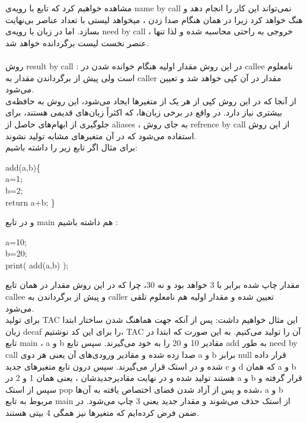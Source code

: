 مشاهده خواهیم کرد که تابع با رویه‌ی
name by call
نمی‌تواند این کار را انجام دهد و هنگ خواهد کرد زیرا در همان هنگام صدا زدن ،
میخواهد لیستی با تعداد عناصر بی‌نهایت بسازد.
اما در زبان با رویه‌ی
need by call
،
خروجی به راحتی محاسبه شده و لذا تنها عنصر نخست لیست برگردانده خواهد شد.
\\
\\
روش 
result by call
:
در این روش
مقدار اولیه
هنگام خوانده شدن در 
callee
نامعلوم است ولی پیش از برگرداندن مقدار به
caller
مقدار در آن کپی خواهد شد و تعیین می‌شود.
\\
از آنجا که در این روش کپی از هر یک از متغیرها ایجاد می‌شود،
این روش به حافظه‌ی بیشتری نیاز دارد.
در واقع در برخی زبان‌ها، که اکثراً زبان‌های قدیمی هستند،
برای جلوگیری از ابهام‌های حاصل از
aliases
،
به جای روش
refrence by call
از این روش استفاده می‌شود که در آن متغیرهای
مشابه تولید نشوند.
\\
برای مثال اگر تابع  زیر را داشته باشیم:
\begin{latin}
add(a,b)\small\{
\\
a=1;
\\
b=2;
\\
return a+b;
\small\}
\\
\end{latin}
و در تابع main
هم داشته باشیم
:
\begin{latin}
a=10;
\\
b=20;
\\
print( add(a,b) );
\end{latin}
مقدار چاپ شده برابر با 3 خواهد بود و نه 30،
چرا که در این روش مقدار در همان تابع callee
و پیش از برگرداندن به 
caller
تعیین شده و مقدار اولیه هم 
نامعلوم تلقی می‌شود.
\\
برای تولید
TAC
این مثال خواهیم داشت:
پس از آنکه جهت هماهنگ شدن ساختار ابتدا زبان decaf
را برای این کد نوشتیم،
TAC
آن را تولید می‌کنیم.
به این صورت که ابتدا در تابع 
main
،
a
و
b
مقادیر 10 و 20 را به
خود می‌گیرند.
سپس تابع
add
به طور
need by call
صدا زده شده و مقادیر ورودی‌های
آن یعنی هر دوی 
a
و
b
برابر
null
قرار داده شده و در استک قرار می‌گیرند.
سپس درون تابع متغیرهای جدید 
c
و
d
که همان
a
و
b
هستند تولید شده و در نهایت مقادیرجدیدشان 
،
یعنی همان 1 و 2
در
a
و
b
قرار گرفته و سپس از استک
pop 
شده و پس از آزاد شدن فضای اختصاص یافته به آن‌ها،
a
و
b
مربوط به تابع
main
از استک حذف می‌شوند و مقدار جدید یعنی 3
چاپ می‌شود.
در ضمن فرض کرده‌ایم که متغیرها نیز همگی 4 بیتی هستند.

